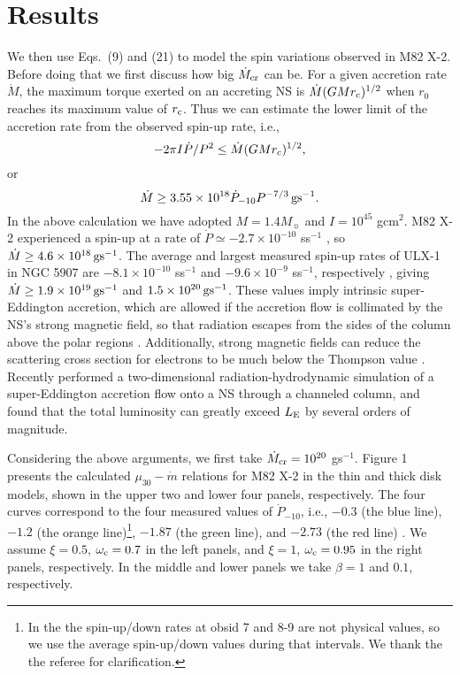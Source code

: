 \documentclass[12pt,preprint]{aastex}
\begin{document}
\section{Results}

We then use Eqs.~(9) and (21) to model the spin variations observed in M82 X-2. Before doing that we first discuss how big $\dot{M}_{\rm cr}$ can be.
 For a given accretion rate $\dot{M}$, the maximum torque exerted on an accreting NS is $\dot{M}(GMr_{\rm c})^{1/2}$ when $r_0$ reaches its maximum value of $r_{\rm c}$. Thus we can estimate the lower limit of the accretion rate from the observed spin-up rate, i.e.,
\begin{equation}
-2\pi I\dot{P}/P^2\leq \dot{M}(GMr_{\rm c})^{1/2},
\end{equation}
or
\begin{equation}
\dot{M}\geq 3.55\times 10^{18}\dot{P}_{-10}P^{-7/3}\,{\rm gs}^{-1}.
\end{equation}
In the above calculation we have adopted $M=1.4M_\sun$ and $I=10^{45}$ gcm$^2$. M82 X-2 experienced a spin-up at a rate of $\dot{P}\simeq -2.7\times 10^{-10}$ ss$^{-1}$ \citep{bhw2014}, so $\dot{M}\geq 4.6\times 10^{18}\,{\rm gs}^{-1}$. The average and largest measured spin-up rates of ULX-1 in NGC 5907 are $-8.1\times 10^{-10}$ ss$^{-1}$ and $-9.6\times 10^{-9}$ ss$^{-1}$, respectively \citep{i2016a}, giving $\dot{M}\geq 1.9\times 10^{19}\,{\rm gs}^{-1}$ and $1.5\times 10^{20}\,{\rm gs}^{-1}$. These values imply intrinsic super-Eddington accretion, which are allowed if the accretion flow is collimated by the NS's strong magnetic field, so that radiation escapes from the sides of the column above the polar regions \citep{bs1976a,bs1976b,mstp2015}. Additionally, strong magnetic fields can reduce the scattering cross section for electrons to be much below the Thompson value \citep{c1971,h1979,p1992}. Recently \citet{kmoo2016} performed a two-dimensional radiation-hydrodynamic simulation of a super-Eddington accretion flow onto a NS through a channeled column, and found that the total luminosity can greatly exceed $L_{\rm E}$ by several orders of magnitude.

Considering the above arguments, we first take $\dot{M}_{\rm cr}=10^{20}$ gs$^{-1}$. Figure 1 presents the calculated $\mu_{30}-\dot{m}$ relations for M82 X-2 in the thin and thick disk models, shown in the upper two and lower four panels, respectively. The four curves correspond to the four measured values of $\dot{P}_{-10}$, i.e., $-0.3$ (the blue line), $\bm{-1.2}$ (the orange line)\footnote{In the \citet{bhw2014} the spin-up/down rates at obsid 7 and 8-9 are not physical values, so we use the average spin-up/down values during that intervals. We thank the the referee for clarification.}, $\bm{-1.87}$ (the green line), and $-2.73$ (the red line) \citep{bhw2014}.
We assume $\xi=0.5$, $\omega_{\rm c}=0.7$ in the left panels, and $\xi=1$, $\omega_{\rm c}=0.95$ in the right panels, respectively. In the middle and lower panels we take $\beta=1$ and $0.1$, respectively.
\end{document}
